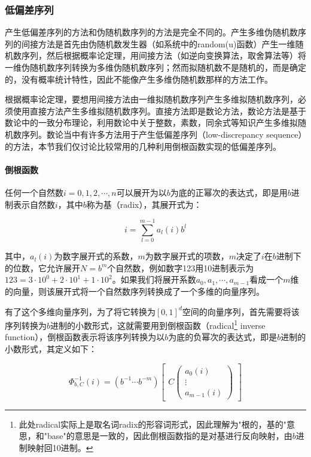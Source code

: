 \subsubsection{低偏差序列}
产生低偏差序列的方法和伪随机数序列的方法是完全不同的。产生多维伪随机数序列的间接方法是首先由伪随机数发生器（如系统中的random(u)函数）产生一维随机数序列，然后根据概率论定理，用间接方法（如逆向变换算法，取舍算法等）将一维伪随机数序列转换为多维伪随机数序列；然而拟随机数不是随机的，而是确定的，没有概率统计特性，因此不能像产生多维伪随机数那样的方法工作。

根据概率论定理，要想用间接方法由一维拟随机数序列产生多维拟随机数序列，必须使用直接方法产生多维拟随机数序列。直接方法即是数论方法，数论方法是基于数论中的一致分布理论，利用数论中关于整数，素数，同余式等知识产生多维拟随机数序列。数论当中有许多方法用于产生低偏差序列（low-discrepancy sequence）的方法，本节我们仅讨论比较常用的几种利用倒根函数实现的低偏差序列。





\paragraph{倒根函数}
任何一个自然数$i=0,1,2,\cdots,n$可以展开为以$b$为底的正幂次的表达式，即是用$b$进制表示自然数$i$，其中$b$称为基（radix），其展开式为：

\begin{equation}
	i=\sum^{m-1}_{l=0}a_l(i)b^{l}
\end{equation}

\noindent 其中，$a_l(i)$为数字展开式的系数，$m$为数字展开式的项数，$m$决定了$i$在$b$进制下的位数，它允许展开$N=b^{m}$个自然数，例如数字123用10进制表示为$123=3\cdot 10^{0}+2\cdot 10^{1}+1\cdot 10^{2}$。如果我们将展开系数$a_0,a_1,\cdots,a_{m-1}$看成一个$m$维的向量，则该展开式将一个自然数序列转换成了一个多维的向量序列。

有了这个多维向量序列，为了将它转换为$[0,1]^d$空间的向量序列，首先需要将该序列转换为$b$进制的小数形式，这就需要用到倒根函数（radical\footnote{此处radical实际上是取名词radix的形容词形式，因此理解为"根的，基的"意思，和"base"的意思是一致的，因此倒根函数指的是对基进行反向映射，由$b$进制映射回10进制。} inverse function），倒根函数表示将该序列转换为以$b$为底的负幂次的表达式，即是$b$进制的小数形式，其定义如下：

\begin{equation}
	\Phi^{-1}_{b,C}(i)=(b^{-1}\cdots b^{-m})\begin{bmatrix}
	 C \begin{pmatrix}
		a_0(i)\\
		\vdots\\
		a_{m-1}(i)
	\end{pmatrix} \end{bmatrix}
\end{equation}

